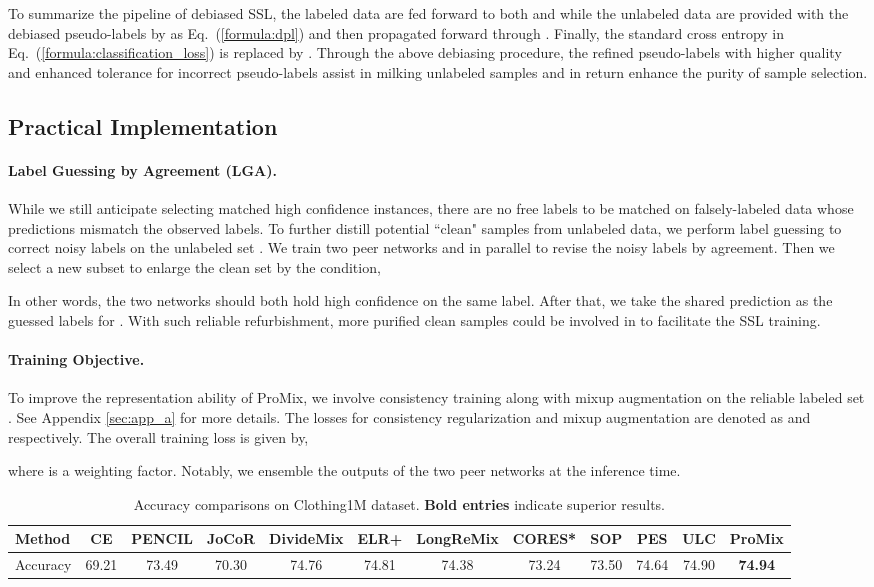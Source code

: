 \documentclass{article}
\begin{document}
To summarize the pipeline of debiased SSL, the labeled data are fed forward to both  and  while the unlabeled data are provided with the debiased pseudo-labels by  as Eq.~(\ref{formula:dpl}) and then propagated forward through . Finally, the standard cross entropy in Eq.~(\ref{formula:classification_loss}) is replaced by . Through the above debiasing procedure, the refined pseudo-labels with higher quality and enhanced tolerance for incorrect pseudo-labels assist in milking unlabeled samples and in return enhance the purity of sample selection.
 
 
\subsection{Practical Implementation}
\paragraph{Label Guessing by Agreement (LGA). } While we still anticipate selecting matched high confidence instances, there are no free labels to be matched on falsely-labeled data whose predictions mismatch the observed labels. To further distill potential ``clean" samples from unlabeled data, we perform label guessing to correct noisy labels on the unlabeled set . We train two peer networks  and  in parallel to revise the noisy labels by agreement. Then we select a new subset  to enlarge the clean set  by the condition,

In other words, the two networks should both hold high confidence on the same label. After that, we take the shared prediction  as the guessed labels for . With such reliable refurbishment, more purified clean samples could be involved in  to facilitate the SSL training.
\paragraph{Training Objective. }
To improve the representation ability of ProMix, we involve consistency training along with mixup augmentation on the reliable labeled set
. See Appendix \ref{sec:app_a} for more details. The losses for consistency regularization and mixup augmentation are denoted as  and  respectively. The overall training loss is given by,

where  is a weighting factor. Notably, we ensemble the outputs of the two peer networks at the inference time.

\begin{table*}[!t]
 \centering

 \small
\begin{tabular}{l|cccccccccc|c}
\toprule
Method & CE    &  PENCIL & JoCoR    & DivideMix  & ELR+ & LongReMix  &  CORES*  & SOP & PES    & ULC & \textbf{ProMix} \\ \midrule
Accuracy & 69.21 & 73.49           & 70.30           & 74.76      & 74.81        & 74.38   &  73.24   & 73.50 & 74.64 & 74.90& \textbf{74.94} \\ \bottomrule
\end{tabular}
\caption{Accuracy comparisons on Clothing1M dataset. \textbf{Bold entries} indicate superior results.}
 \label{tab:clothing1m}
\end{table*}
\end{document}
